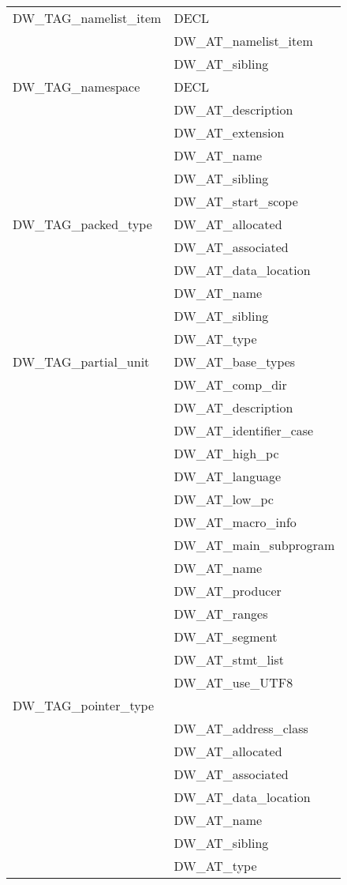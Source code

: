 \begin{longtable}{l|p{8cm}}
DW\_TAG\_namelist\_item
&DECL \\
&DW\_AT\_namelist\_item \\
&DW\_AT\_sibling \\

DW\_TAG\_namespace
&DECL \\
&DW\_AT\_description \\
&DW\_AT\_extension \\
&DW\_AT\_name \\
&DW\_AT\_sibling \\
&DW\_AT\_start\_scope \\

DW\_TAG\_packed\_type
&DW\_AT\_allocated \\
&DW\_AT\_associated \\
&DW\_AT\_data\_location \\
&DW\_AT\_name \\
&DW\_AT\_sibling \\
&DW\_AT\_type \\

DW\_TAG\_partial\_unit
&DW\_AT\_base\_types  \\  
&DW\_AT\_comp\_dir  \\
&DW\_AT\_description  \\
&DW\_AT\_identifier\_case  \\
&DW\_AT\_high\_pc  \\
&DW\_AT\_language  \\
&DW\_AT\_low\_pc  \\
&DW\_AT\_macro\_info  \\
&DW\_AT\_main\_subprogram  \\
&DW\_AT\_name  \\
&DW\_AT\_producer  \\
&DW\_AT\_ranges  \\
&DW\_AT\_segment  \\
&DW\_AT\_stmt\_list  \\
&DW\_AT\_use\_UTF8  \\


DW\_TAG\_pointer\_type  \\
&DW\_AT\_address\_class  \\
&DW\_AT\_allocated  \\
&DW\_AT\_associated  \\
&DW\_AT\_data\_location  \\
&DW\_AT\_name  \\
&DW\_AT\_sibling  \\
&DW\_AT\_type  \\


\end{longtable}
